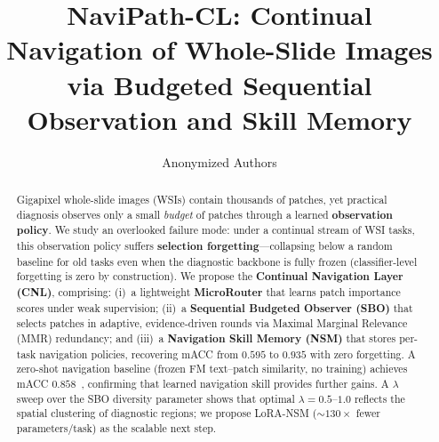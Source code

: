 \documentclass[runningheads]{llncs}
\begin{document}
\title{NaviPath-CL: Continual Navigation of Whole-Slide Images via
Budgeted Sequential Observation and Skill Memory}

\author{Anonymized Authors}


\maketitle

\begin{abstract}
Gigapixel whole-slide images (WSIs) contain thousands of patches, yet
practical diagnosis observes only a small \emph{budget} of patches
through a learned \textbf{observation policy}. We study an overlooked
failure mode: under a continual stream of WSI tasks, this observation
policy suffers \textbf{selection forgetting}---collapsing below a
random baseline for old tasks even when the diagnostic backbone is
fully frozen (classifier-level forgetting is zero by construction). We
propose the \textbf{Continual Navigation Layer (CNL)}, comprising:
(i)~a lightweight \textbf{MicroRouter} that learns patch importance
scores under weak supervision; (ii)~a \textbf{Sequential Budgeted
Observer (SBO)} that selects patches in adaptive, evidence-driven
rounds via Maximal Marginal Relevance (MMR) redundancy; and (iii)~a
\textbf{Navigation Skill Memory (NSM)} that stores per-task navigation
policies, recovering mACC from $0.595$ to $\mathbf{0.935}$ with zero
forgetting. A zero-shot navigation baseline (frozen FM text--patch
similarity, no training) achieves mACC $0.858$~\cite{zeroslide},
confirming that learned navigation skill provides further gains. A
$\lambda$ sweep over the SBO diversity parameter shows that optimal
$\lambda{=}0.5$--$1.0$ reflects the spatial clustering of diagnostic
regions; we propose LoRA-NSM (${\sim}130\times$ fewer parameters/task)
as the scalable next step.
\end{abstract}
\end{document}
